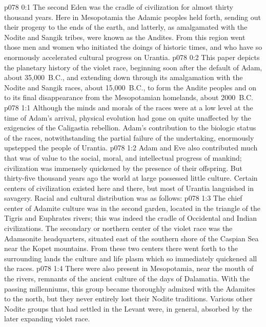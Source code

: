 \author{Archangel}
\vs p078 0:1 The second Eden was the cradle of civilization for almost thirty thousand years. Here in Mesopotamia the Adamic peoples held forth, sending out their progeny to the ends of the earth, and latterly, as amalgamated with the Nodite and Sangik tribes, were known as the Andites. From this region went those men and women who initiated the doings of historic times, and who have so enormously accelerated cultural progress on Urantia.\plusone
\vs p078 0:2 This paper depicts the planetary history of the violet race, beginning soon after the default of Adam, about 35,000~B.C., and extending down through its amalgamation with the Nodite and Sangik races, about 15,000~B.C., to form the Andite peoples and on to its final disappearance from the Mesopotamian homelands, about 2000~B.C.
\vs p078 1:1 Although the minds and morals of the races were at a low level at the time of Adam’s arrival, physical evolution had gone on quite unaffected by the exigencies of the Caligastia rebellion. Adam’s contribution to the biologic status of the races, notwithstanding the partial failure of the undertaking, enormously upstepped the people of Urantia.
\vs p078 1:2 Adam and Eve also contributed much that was of value to the social, moral, and intellectual progress of mankind; civilization was immensely quickened by the presence of their offspring. But thirty\hyp{}five thousand years ago the world at large possessed little culture. Certain centers of civilization existed here and there, but most of Urantia languished in savagery. Racial and cultural distribution was as follows:\plusone
\pc \vs p078 1:3 \bibnobreakspace {} The chief center of Adamite culture was in the second garden, located in the triangle of the Tigris and Euphrates rivers; this was indeed the cradle of Occidental and Indian civilizations. The secondary or northern center of the violet race was the Adamsonite headquarters, situated east of the southern shore of the Caspian Sea near the Kopet mountains. From these two centers there went forth to the surrounding lands the culture and life plasm which so immediately quickened all the races.
\pc \vs p078 1:4 \bibnobreakspace {} There were also present in Mesopotamia, near the mouth of the rivers, remnants of the ancient culture of the days of Dalamatia. With the passing millenniums, this group became thoroughly admixed with the Adamites to the north, but they never entirely lost their Nodite traditions. Various other Nodite groups that had settled in the Levant were, in general, absorbed by the later expanding violet race.
